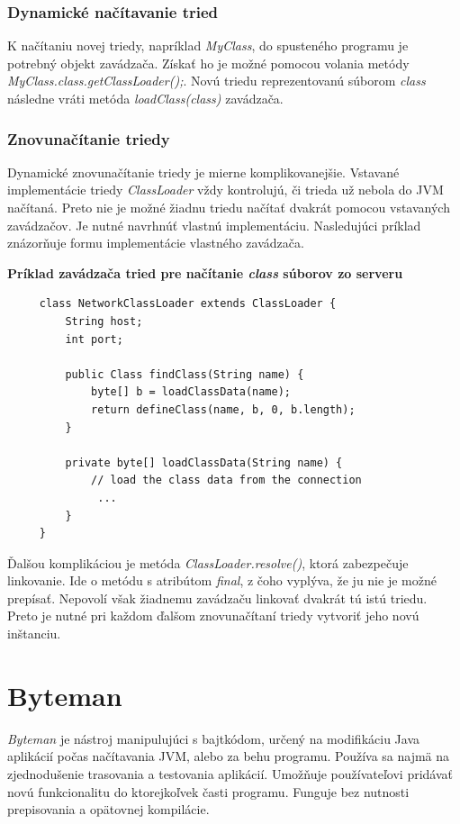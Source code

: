 \documentclass[11pt,final,oneside]{fithesis}
\newenvironment{example}[1]
{
\vspace{3mm}
\noindent\textbf{#1}
\vspace{2mm}
}
{
\vspace{3mm}
}
\begin{document}
\subsection{Dynamické načítavanie tried}
K načítaniu novej triedy, napríklad \textit{MyClass}, do spusteného programu 
je potrebný objekt zavádzača. Získať ho je možné pomocou volania metódy 
\textit{MyClass.class.getClassLoader();}.
Novú triedu reprezentovanú súborom \textit{class} následne vráti metóda 
\textit{loadClass(class)} zavádzača.

\subsection{Znovunačítanie triedy}
Dynamické znovunačítanie triedy je mierne komplikovanejšie. Vstavané 
implementácie triedy \textit{ClassLoader} vždy kontrolujú, či trieda už nebola 
do JVM načítaná. Preto nie je možné žiadnu triedu načítať dvakrát pomocou 
vstavaných zavádzačov. Je nutné navrhnúť vlastnú implementáciu. Nasledujúci 
príklad znázorňuje formu implementácie vlastného zavádzača.

\begin{example}{Príklad zavádzača tried pre načítanie \textit{class} súborov zo
serveru}
\begin{verbatim}
     class NetworkClassLoader extends ClassLoader {
         String host;
         int port;

         public Class findClass(String name) {
             byte[] b = loadClassData(name);
             return defineClass(name, b, 0, b.length);
         }

         private byte[] loadClassData(String name) {
             // load the class data from the connection
              ...
         }
     }
\end{verbatim}
\cite{Oracle:ClassLoader}
\end{example}

Ďalšou komplikáciou je metóda \textit{ClassLoader.resolve()},
ktorá zabezpečuje linkovanie. Ide o metódu s atribútom \textit{final}, z čoho 
vyplýva, že ju nie je možné prepísať. Nepovolí však žiadnemu zavádzaču
linkovať dvakrát tú istú triedu. Preto je nutné pri každom ďalšom
znovunačítaní triedy vytvoriť jeho novú inštanciu.

\chapter{Byteman}
\label{chap:Byteman}

\textit{Byteman} je nástroj manipulujúci s bajtkódom, určený na modifikáciu 
Java aplikácií počas načítavania JVM, alebo za behu programu. 
Používa sa najmä na zjednodušenie trasovania a testovania aplikácií. Umožňuje 
používateľovi pridávať novú funkcionalitu do ktorejkoľvek časti programu.
Funguje bez nutnosti prepisovania a opätovnej kompilácie.
\end{document}

